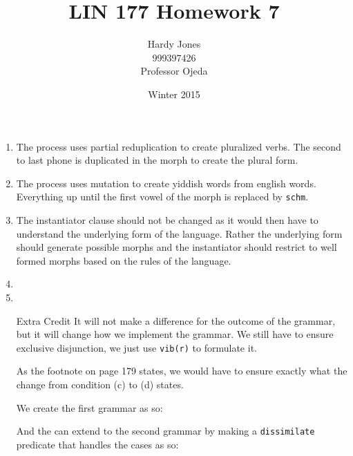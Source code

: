 \documentclass[12pt,letterpaper]{article}
\title{LIN 177 Homework 7\vspace{-2ex}}
\author{Hardy Jones\\
        999397426\\
        Professor Ojeda\vspace{-2ex}}
\date{Winter 2015}
\begin{document}
  \maketitle


  \begin{enumerate}
    \item
      The process uses partial reduplication to create pluralized verbs.
      The second to last phone is duplicated in the morph to create the plural form.


    \item
      The process uses mutation to create yiddish words from english words.
      Everything up until the first vowel of the morph is replaced by \texttt{schm}.


    \item
      The instantiator clause should not be changed as it would then have to understand the underlying form of the language.
      Rather the underlying form should generate possible morphs and the instantiator should restrict to well formed morphs based on the rules of the language.

      

    \item

    \item

    \item [Extra Credit]
      It will not make a difference for the outcome of the grammar, but it will change how we implement the grammar. We still have to ensure exclusive disjunction, we just use \texttt{vib(r)} to formulate it.

      As the footnote on page 179 states, we would have to ensure exactly what the change from condition (c) to (d) states.

      We create the first grammar as so:


      And the can extend to the second grammar by making a \texttt{dissimilate} predicate that handles the cases as so:

  \end{enumerate}
\end{document}
